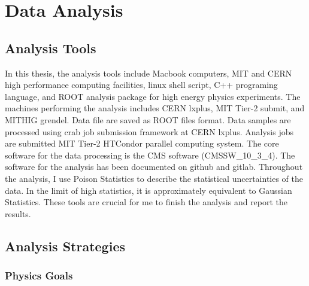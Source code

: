 \chapter{Data Analysis}

\section{Analysis Tools}

In this thesis, the analysis tools include Macbook computers, MIT and CERN high performance computing facilities, linux shell script, C++ programing language, and ROOT analysis package for high energy physics experiments. The machines performing the analysis includes CERN lxplus, MIT Tier-2 submit, and MITHIG grendel. Data file are saved as ROOT files format. Data samples are processed using crab job submission framework at CERN lxplus. Analysis jobs are submitted MIT Tier-2 HTCondor parallel computing system. The core software for the data processing is the CMS software (CMSSW\_10\_3\_4). The software for the analysis has been documented on github and gitlab. Throughout the analysis, I use Poison Statistics to describe the statistical uncertainties of the data. In the limit of high statistics, it is approximately equivalent to Gaussian Statistics. These tools are crucial for me to finish the analysis and report the results.

\section{Analysis Strategies}

\subsection{Physics Goals}

